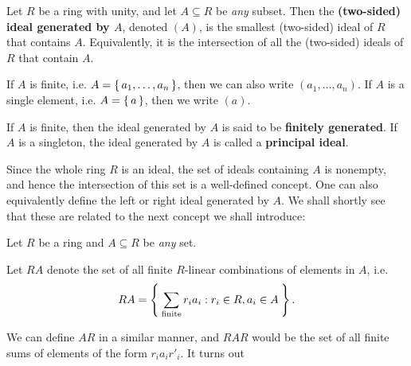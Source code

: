 \documentclass[./main.tex]{subfiles}
\begin{document}
\begin{definition}
\label{def:generation-of-ideals}
Let $R$ be a ring with unity, and let $A \subseteq R$ be \emph{any} subset. Then the
\textbf{(two-sided) ideal generated by $A$}, denoted $(A)$, is the smallest (two-sided) ideal of $R$
that contains $A$. Equivalently, it is the intersection of all the (two-sided) ideals of $R$
that contain $A$.

If $A$ is finite, i.e. $A = \set{a_1, \dots, a_n}$, then we can also write
$(a_1, \dots, a_n)$. If $A$ is a single element, i.e. $A = \set{a}$, then we
write $(a)$.
\end{definition}
If $A$ is finite, then the ideal generated by $A$ is said to be \textbf{finitely
generated}. If $A$ is a singleton, the ideal generated by $A$ is called a
\textbf{principal ideal}.

Since the whole ring $R$ is an ideal, the set of ideals containing $A$ is
nonempty, and hence the intersection of this set is a well-defined concept. One
can also equivalently define the left or right ideal generated by $A$. We shall
shortly see that these are related to the next concept we shall introduce:


\begin{definition}
    Let $R$ be a ring and $A \subseteq R$ be \emph{any} set.
    
    Let $RA$ denote the set of all finite $R$-linear combinations of 
    elements in $A$, i.e. 
    \[
        RA = \Set{\sum_{\text{finite}} r_i a_i : r_i \in R, a_i \in A}.
    \]
\end{definition}
We can define $AR$ in a similar manner, and $RAR$ would be the set of all finite
sums of elements of the form $r_i a_i r'_i$.
It turns out 
\end{document}

